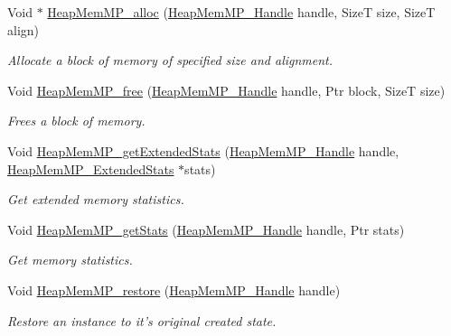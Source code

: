 \begin{DoxyCompactItemize}
Void $\ast$ \hyperlink{_heap_mem_m_p_8h_a04ab3af78110251e5f22f9bc9a961a95}{HeapMemMP\_\-alloc} (\hyperlink{_heap_mem_m_p_8h_a9aa6360e22c2f5f387c5aba52a1a8522}{HeapMemMP\_\-Handle} handle, SizeT size, SizeT align)
\begin{DoxyCompactList}\small\item\em Allocate a block of memory of specified size and alignment. \item\end{DoxyCompactList}\item 
Void \hyperlink{_heap_mem_m_p_8h_af424678d0776b662701672c9b737e0bc}{HeapMemMP\_\-free} (\hyperlink{_heap_mem_m_p_8h_a9aa6360e22c2f5f387c5aba52a1a8522}{HeapMemMP\_\-Handle} handle, Ptr block, SizeT size)
\begin{DoxyCompactList}\small\item\em Frees a block of memory. \item\end{DoxyCompactList}\item 
Void \hyperlink{_heap_mem_m_p_8h_a1ee8a7319a0ed2344dea9d7b1bbbd3ee}{HeapMemMP\_\-getExtendedStats} (\hyperlink{_heap_mem_m_p_8h_a9aa6360e22c2f5f387c5aba52a1a8522}{HeapMemMP\_\-Handle} handle, \hyperlink{struct_heap_mem_m_p___extended_stats}{HeapMemMP\_\-ExtendedStats} $\ast$stats)
\begin{DoxyCompactList}\small\item\em Get extended memory statistics. \item\end{DoxyCompactList}\item 
Void \hyperlink{_heap_mem_m_p_8h_a5ce7746f4d08dd3fb94e692f6f544b67}{HeapMemMP\_\-getStats} (\hyperlink{_heap_mem_m_p_8h_a9aa6360e22c2f5f387c5aba52a1a8522}{HeapMemMP\_\-Handle} handle, Ptr stats)
\begin{DoxyCompactList}\small\item\em Get memory statistics. \item\end{DoxyCompactList}\item 
Void \hyperlink{_heap_mem_m_p_8h_a8a610d9bdd7650bf42d52841915a42a0}{HeapMemMP\_\-restore} (\hyperlink{_heap_mem_m_p_8h_a9aa6360e22c2f5f387c5aba52a1a8522}{HeapMemMP\_\-Handle} handle)
\begin{DoxyCompactList}\small\item\em Restore an instance to it's original created state. \item\end{DoxyCompactList}\end{DoxyCompactItemize}


